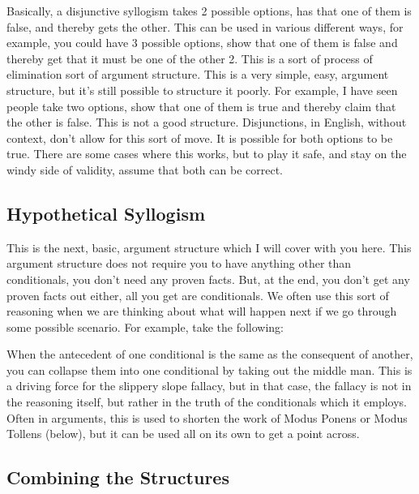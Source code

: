 Basically, a disjunctive syllogism takes 2 possible options, has that one of them is false, and thereby gets the other. This can be used in various different ways, for example, you could have 3 possible options, show that one of them is false and thereby get that it must be one of the other 2. This is a sort of process of elimination sort of argument structure. This is a very simple, easy, argument structure, but it's still possible to structure it poorly. For example, I have seen people take two options, show that one of them is true and thereby claim that the other is false. This is not a good structure. Disjunctions, in English, without context, don't allow for this sort of move. It is possible for both options to be true. There are some cases where this works, but to play it safe, and stay on the windy side of validity, assume that both can be correct. 

\subsection{Hypothetical Syllogism}
\label{s:p1.3.4}

This is the next, basic, argument structure which I will cover with you here. This argument structure does not require you to have anything other than conditionals, you don't need any proven facts. But, at the end, you don't get any proven facts out either, all you get are conditionals. We often use this sort of reasoning when we are thinking about what will happen next if we go through some possible scenario. For example, take the following:


When the antecedent of one conditional is the same as the consequent of another, you can collapse them into one conditional by taking out the middle man. This is a driving force for the slippery slope fallacy, but in that case, the fallacy is not in the reasoning itself, but rather in the truth of the conditionals which it employs. Often in arguments, this is used to shorten the work of Modus Ponens or Modus Tollens (below), but it can be used all on its own to get a point across. 

\subsection{Combining the Structures}

